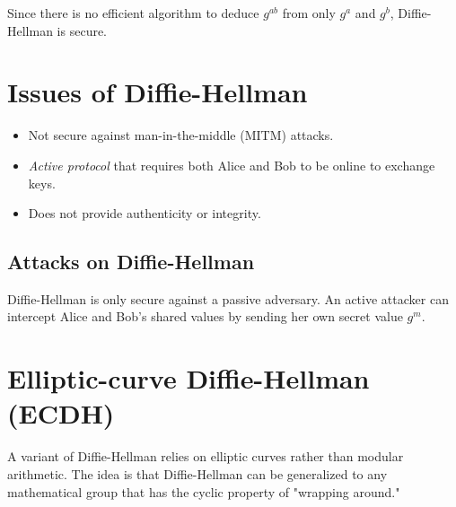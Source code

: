 \medskip

Since there is no efficient algorithm to deduce $g^{ab}$ from only $g^a$ and $g^b$, Diffie-Hellman is secure.

\section{Issues of Diffie-Hellman}
\begin{itemize}
    \item Not secure against man-in-the-middle (MITM) attacks.
    \item \emph{Active protocol} that requires both Alice and Bob to be online to exchange keys.
    \item Does not provide authenticity or integrity.
\end{itemize}

\subsection{Attacks on Diffie-Hellman}
Diffie-Hellman is only secure against a passive adversary. An active attacker can intercept Alice and Bob's shared values by sending her own secret value $g^m$.

\section{Elliptic-curve Diffie-Hellman (ECDH)}
A variant of Diffie-Hellman relies on elliptic curves rather than modular arithmetic. The idea is that Diffie-Hellman can be generalized to any mathematical group that has the cyclic property of "wrapping around."